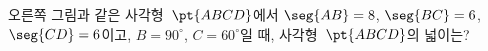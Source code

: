 \noindent\begin{minipage}[t]{0.58\linewidth}\vspace{0pt}\raggedright 오른쪽 그림과 같은 사각형~$\pt{ABCD}$에서 $\seg{AB}=8$, $\seg{BC}=6$, $\seg{CD}=6$이고, $B=90^\circ$, $C=60^\circ$일 때, 사각형~$\pt{ABCD}$의 넓이는?\end{minipage}\hfill\begin{minipage}[t]{0.4\linewidth}\vspace{0pt}\centering \resizebox{\ifdim\width>\linewidth\linewidth\else\width\fi}{!}{}\end{minipage}\par
{}
